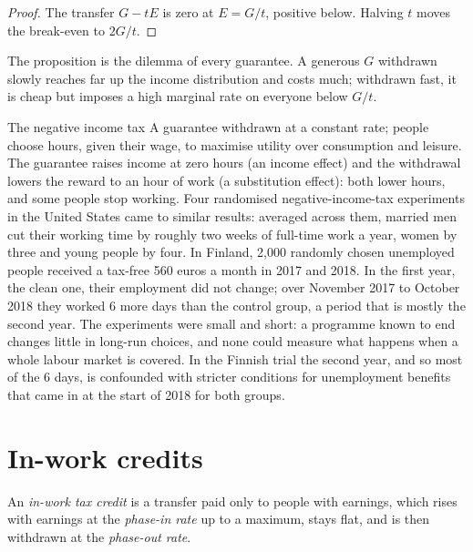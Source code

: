 \begin{proof}
The transfer $G - tE$ is zero at $E = G/t$, positive below. Halving $t$ moves the break-even
to $2G/t$.
\end{proof}

The proposition is the dilemma of every guarantee. A generous $G$ withdrawn slowly
reaches far up the income distribution and costs much; withdrawn fast, it is cheap
but imposes a high marginal rate on everyone below $G/t$.

\begin{model}{The negative income tax}
\assumes A guarantee withdrawn at a constant rate; people choose hours, given
their wage, to maximise utility over consumption and leisure.
\predicts The guarantee raises income at zero hours (an income effect) and the
withdrawal lowers the reward to an hour of work (a substitution effect): both
lower hours, and some people stop working.
\tested Four randomised negative-income-tax experiments in the United States came
to similar results: averaged across them, married men cut their working time by
roughly two weeks of full-time work a year, women by three and young people by four.
In Finland, 2{,}000 randomly chosen unemployed people received a tax-free 560 euros a
month in 2017 and 2018. In the first year, the clean one, their employment did not
change; over November 2017 to October 2018 they worked 6 more days than the control
group, a period that is mostly the second year. %
\breaks The experiments were small and short: a programme known to end changes
little in long-run choices, and none could measure what happens when a whole
labour market is covered. In the Finnish trial the second year, and so most of the
6 days, is confounded with stricter conditions for unemployment benefits that came
in at the start of 2018 for both groups.
\end{model}

\section{In-work credits}\label{sec:b3:transfers-and-incentives:in-work}

\begin{definition}\label{def:b3:transfers-and-incentives:in-work}
An \emph{in-work tax credit} is a transfer paid only to people with earnings, which
rises with earnings at the \emph{phase-in rate} up to a maximum, stays flat, and is
then withdrawn at the \emph{phase-out rate}.
\end{definition}

